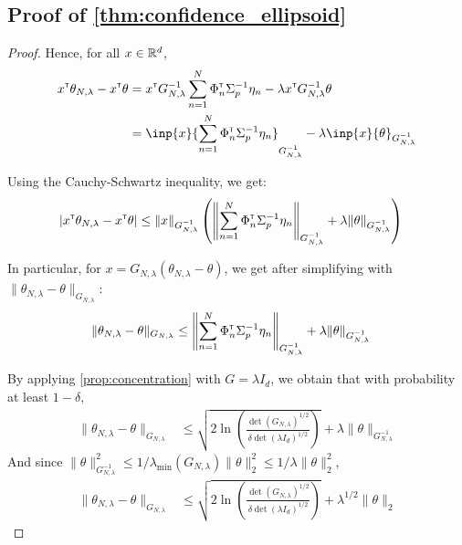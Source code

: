 \documentclass{article}
\begin{document}
\subsection{Proof of \autoref{thm:confidence_ellipsoid}}

\begin{proof}

Hence, for all $x\in\mathbb{R}^d$,
\begin{align*}
    x^\transp\theta_{N,\lambda}  -x^\transp\theta &= x^\transp G_{N, \lambda}^{-1}\sum_{n=1}^N \Phi_n^\transp \Sigma_p^{-1}\eta_n
    - \lambda x^\transp G_{N, \lambda}^{-1}\theta\\
    &= \inp{x}{\sum_{n=1}^N \Phi_n^\transp \Sigma_p^{-1}\eta_n}_{G_{N, \lambda}^{-1}} - \lambda\inp{x}{\theta}_{G_{N, \lambda}^{-1}}
\end{align*}

Using the Cauchy-Schwartz inequality, we get:
\begin{align*}
    |x^{\mathsf{\scriptscriptstyle T}}\theta_{N,\lambda}  -x^{\mathsf{\scriptscriptstyle T}}\theta| &\leq \|x\|_{G_{N, \lambda}^{-1}}\left(\left\|\sum_{n=1}^N \Phi_n^{\mathsf{\scriptscriptstyle T}} \Sigma_p^{-1}\eta_n\right\|_{G_{N, \lambda}^{-1}} + \lambda\|\theta\|_{G_{N, \lambda}^{-1}}\right)
\end{align*}

In particular, for $x = G_{N,\lambda}(\theta_{N,\lambda} - \theta)$, we get after simplifying with $\| \theta_{N,\lambda}  - \theta\|_{G_{N,\lambda}}$:
\begin{align*}
    \| \theta_{N,\lambda}  - \theta\|_{G_{N,\lambda}} &\leq \left\|\sum_{n=1}^N \Phi_n^{\mathsf{\scriptscriptstyle T}} \Sigma_p^{-1}\eta_n\right\|_{G_{N, \lambda}^{-1}} + \lambda\|\theta\|_{G_{N, \lambda}^{-1}}
\end{align*}

By applying \autoref{prop:concentration} with $G=\lambda I_d$, we obtain that with probability at least $1-\delta$,
\begin{align*}
    \| \theta_{N,\lambda}  - \theta\|_{G_{N,\lambda}} &\leq \sqrt{2\ln \left(\frac{\det(G_{N,\lambda})^{1/2}}{\delta\det(\lambda I_d)^{1/2}}\right)}
     + \lambda\|\theta\|_{G_{N, \lambda}^{-1}}
\end{align*}
And since $\|\theta\|_{G_{N, \lambda}^{-1}}^2 \leq 1/\lambda_{\min}(G_{N,\lambda})\|\theta\|_2^2 \leq 1/\lambda \|\theta\|_2^2$,
\begin{align*}
    \| \theta_{N,\lambda}  - \theta\|_{G_{N,\lambda}} &\leq \sqrt{2\ln \left(\frac{\det(G_{N,\lambda})^{1/2}}{\delta\det(\lambda I_d)^{1/2}}\right)}
     + \lambda^{1/2}\|\theta\|_2
\end{align*}
\end{proof}
\end{document}
